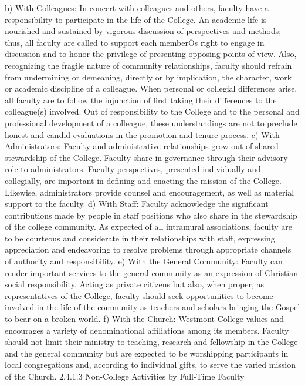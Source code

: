 \documentclass[letterpaper, 11pt]{article}
\begin{document}
b) With Colleagues:  In concert with colleagues and others, faculty have a responsibility to participate in the life of the College.  An academic life is nourished and sustained by vigorous discussion of perspectives and methods; thus, all faculty are called to support each memberÕs right to engage in discussion and to honor the privilege of presenting opposing points of view.  Also, recognizing the fragile nature of community relationships, faculty should refrain from undermining or demeaning, directly or by implication, the character, work or academic discipline of a colleague. When personal or collegial differences arise, all faculty are to follow the injunction of first taking their differences to the colleague(s) involved.  Out of responsibility to the College and to the personal and professional development of a colleague, these understandings are not to preclude honest and candid evaluations in the promotion and tenure process.
c) With Administrators:  Faculty and administrative relationships grow out of shared stewardship of the College.  Faculty share in governance through their advisory role to administrators.  Faculty perspectives, presented individually and collegially, are important in defining and enacting the mission of the College.  Likewise, administrators provide counsel and encouragement, as well as material support to the faculty.
d) With Staff:  Faculty acknowledge the significant contributions made by people in staff positions who also share in the stewardship of the college community.  As expected of all intramural associations, faculty are to be courteous and considerate in their relationships with staff, expressing appreciation and endeavoring to resolve problems through appropriate channels of authority and responsibility.
e) With the General Community:  Faculty can render important services to the general community as an expression of Christian social responsibility.  Acting as private citizens but also, when proper, as representatives of the College, faculty should seek opportunities to become involved in the life of the community as teachers and scholars bringing the Gospel to bear on a broken world.
f) With the Church:  Westmont College values and encourages a variety of denominational affiliations among its members.  Faculty should not limit their ministry to teaching, research and fellowship in the College and the general community but are expected to be worshipping participants in local congregations and, according to individual gifts, to serve the varied mission of the Church.
2.4.1.3 Non-College Activities by Full-Time Faculty
\end{document}

